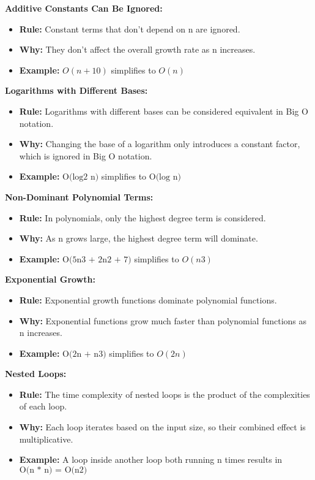 \documentclass[
  letterpaper,
  DIV=11,
  numbers=noendperiod]{scrreprt}
\providecommand{\tightlist}{%
  \setlength{\itemsep}{0pt}\setlength{\parskip}{0pt}}
\begin{document}
\begin{tcolorbox}[enhanced jigsaw, colframe=quarto-callout-note-color-frame, toprule=.15mm, bottomrule=.15mm, rightrule=.15mm, colback=white, breakable, arc=.35mm, opacityback=0, left=2mm, leftrule=.75mm]
\textbf{Additive Constants Can Be Ignored:}

\begin{itemize}
\tightlist
\item
  \textbf{Rule:} Constant terms that don't depend on n are ignored.
\item
  \textbf{Why:} They don't affect the overall growth rate as n
  increases.
\item
  \textbf{Example:} \(O(n+10)\) simplifies to \(O(n)\)
\end{itemize}

\textbf{Logarithms with Different Bases:}

\begin{itemize}
\tightlist
\item
  \textbf{Rule:} Logarithms with different bases can be considered
  equivalent in Big O notation.
\item
  \textbf{Why:} Changing the base of a logarithm only introduces a
  constant factor, which is ignored in Big O notation.
\item
  \textbf{Example:} \(\text{O(log⁡2 n)}\) simplifies to
  \(\text{O(log⁡ n)}\)
\end{itemize}

\textbf{Non-Dominant Polynomial Terms:}

\begin{itemize}
\tightlist
\item
  \textbf{Rule:} In polynomials, only the highest degree term is
  considered.
\item
  \textbf{Why:} As n grows large, the highest degree term will dominate.
\item
  \textbf{Example:} \(\text{O(5n3 + 2n2 + 7)}\) simplifies to \(O(n3)\)
\end{itemize}

\textbf{Exponential Growth:}

\begin{itemize}
\tightlist
\item
  \textbf{Rule:} Exponential growth functions dominate polynomial
  functions.
\item
  \textbf{Why:} Exponential functions grow much faster than polynomial
  functions as n increases.
\item
  \textbf{Example:} \(\text{O(2n + n3)}\) simplifies to \(O(2n)\)
\end{itemize}

\textbf{Nested Loops:}

\begin{itemize}
\tightlist
\item
  \textbf{Rule:} The time complexity of nested loops is the product of
  the complexities of each loop.
\item
  \textbf{Why:} Each loop iterates based on the input size, so their
  combined effect is multiplicative.
\item
  \textbf{Example:} A loop inside another loop both running n times
  results in \(\text{O(n * n) = O(n2)}\)
\end{itemize}


\end{tcolorbox}
\end{document}
